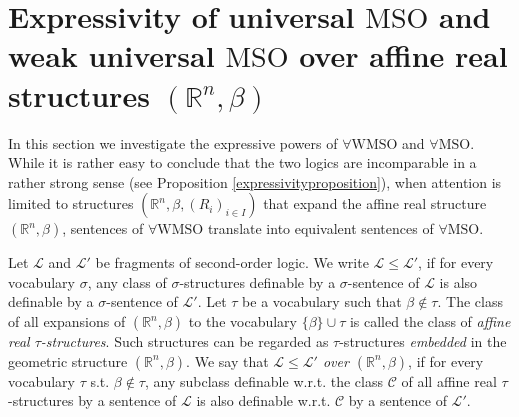 \documentclass{LMCS}
\theoremstyle{plain}
\newcommand{\rp}{(\mathbb{R}^n,\beta)}
\newcommand{\rpm}{\mathbb{R}^n,\beta}
\begin{document}
\section{Expressivity of universal $\mathrm{MSO}$ and
%
weak universal $\mathrm{MSO}$ over affine real structures $(\mathbb{R}^n,\beta)$}\label{section3}
%



%
In this section we investigate the expressive powers of $\forall{\mathrm{WMSO}}$
%
and $\forall\mathrm{MSO}$. While it is rather easy to conclude that the two logics
%
are incomparable in a rather strong sense (see Proposition \ref{expressivityproposition}),
%
when attention is limited to structures $(\rpm,(R_i)_{i\in I})$ that expand the affine real structure $\rp$,
%
sentences of $\forall\mathrm{WMSO}$ translate into equivalent sentences of $\forall\mathrm{MSO}$.
%



%
Let $\mathcal{L}$ and $\mathcal{L}'$ be fragments of second-order logic.
%
We write $\mathcal{L}\leq\mathcal{L}'$, if for every vocabulary $\sigma$,
%
any class of $\sigma$-structures definable by a $\sigma$-sentence of $\mathcal{L}$ is
%
also definable by a $\sigma$-sentence of $\mathcal{L}'$.
%
Let $\tau$ be a vocabulary such that $\beta\not\in\tau$.
%
The class of all expansions of $\rp$ to the vocabulary $\{\beta\}\cup\tau$ is
%
called the class of \emph{affine real $\tau$-structures}. Such structures can be
%
regarded as $\tau$-structures \emph{embedded} in the geometric structure $\rp$.
%
We say that \emph{$\mathcal{L}\leq\mathcal{L'}$ over $\rp$}, if 
%
for every vocabulary $\tau$ s.t. $\beta\not\in\tau$,
%
any subclass definable w.r.t. the class $\mathcal{C}$ of all
%
affine real $\tau$-structures by a sentence of $\mathcal{L}$ is also
%
definable w.r.t. $\mathcal{C}$ by a sentence of $\mathcal{L}'$.
%   
%
%
\end{document}
